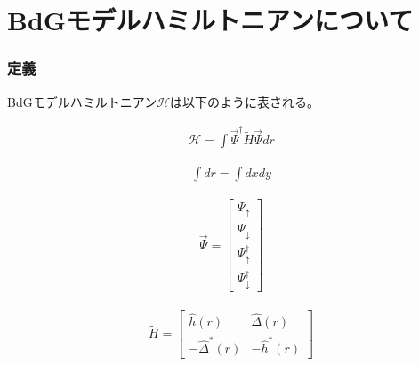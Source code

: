 \documentclass{jsarticle}
\begin{document}
\part{BdGモデルハミルトニアンについて}
	\section{定義}
		BdGモデルハミルトニアン$\mathcal{H}$は以下のように表される。

		\begin{align}
			\mathcal{H}=\int \vec{\Psi}^\dagger \tilde{H}\vec{\Psi}dr
		\end{align}

		\begin{align}
			\int dr=\int dxdy
		\end{align}

		\begin{align}
			\vec{\Psi}=
			\begin{bmatrix}
				\Psi_\uparrow \\
				\Psi_\downarrow \\
				\Psi_\uparrow^\dagger \\
				\Psi_\downarrow^\dagger
			\end{bmatrix}
		\end{align}

		\begin{align}
			\tilde{H}=
			\begin{bmatrix}
				\hat{h}(r) & \hat{\Delta}(r) \\
				-\hat{\Delta}^\ast(r) & -\hat{h}^\ast(r)
			\end{bmatrix}
		\end{align}
\end{document}
